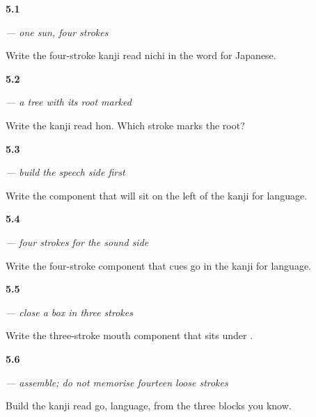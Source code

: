 \noindent\begin{minipage}[t]{\linewidth}
\raggedright
\hypertarget{review-JA-W05-nichi-kanji-four-strokes}{\textbf{5.1}} \emph{ — one sun, four strokes}\par
\small Write the four-stroke kanji read nichi in the word for Japanese.
\end{minipage}\par\medskip

\noindent\begin{minipage}[t]{\linewidth}
\raggedright
\hypertarget{review-JA-W05-hon-kanji-root-mark}{\textbf{5.2}} \emph{ — a tree with its root marked}\par
\small Write the kanji read hon. Which stroke marks the root?
\end{minipage}\par\medskip

\noindent\begin{minipage}[t]{\linewidth}
\raggedright
\hypertarget{review-JA-W05-gen-component-speech-side}{\textbf{5.3}} \emph{ — build the speech side first}\par
\small Write the component that will sit on the left of the kanji for language.
\end{minipage}\par\medskip

\noindent\begin{minipage}[t]{\linewidth}
\raggedright
\hypertarget{review-JA-W05-five-component-four-strokes}{\textbf{5.4}} \emph{ — four strokes for the sound side}\par
\small Write the four-stroke component that cues go in the kanji for language.
\end{minipage}\par\medskip

\noindent\begin{minipage}[t]{\linewidth}
\raggedright
\hypertarget{review-JA-W05-mouth-component-close-box}{\textbf{5.5}} \emph{ — close a box in three strokes}\par
\small Write the three-stroke mouth component that sits under .
\end{minipage}\par\medskip

\noindent\begin{minipage}[t]{\linewidth}
\raggedright
\hypertarget{review-JA-W05-go-kanji-three-blocks}{\textbf{5.6}} \emph{ — assemble; do not memorise fourteen loose strokes}\par
\small Build the kanji read go, language, from the three blocks you know.
\end{minipage}\par\medskip

